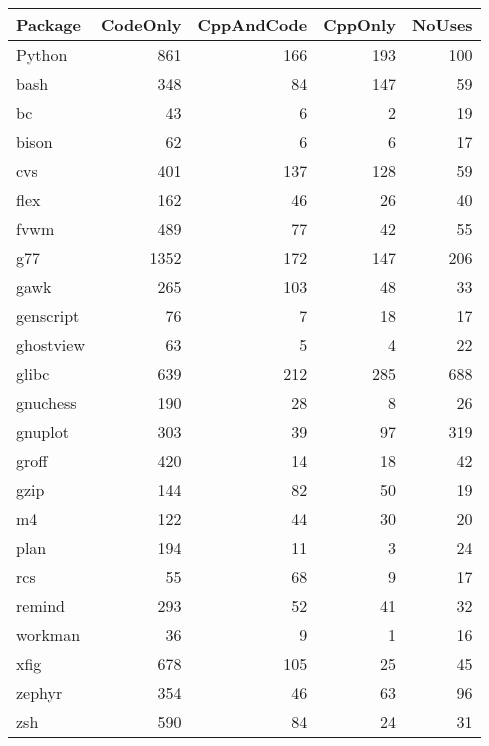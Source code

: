 \begin{tabular}{|l|r|r|r|r|}\hline
Package & CodeOnly & CppAndCode & CppOnly & NoUses\\\hline
Python & 861 & 166 & 193 & 100\\\hline
bash & 348 & 84 & 147 & 59\\\hline
bc & 43 & 6 & 2 & 19\\\hline
bison & 62 & 6 & 6 & 17\\\hline
cvs & 401 & 137 & 128 & 59\\\hline
flex & 162 & 46 & 26 & 40\\\hline
fvwm & 489 & 77 & 42 & 55\\\hline
g77 & 1352 & 172 & 147 & 206\\\hline
gawk & 265 & 103 & 48 & 33\\\hline
genscript & 76 & 7 & 18 & 17\\\hline
ghostview & 63 & 5 & 4 & 22\\\hline
glibc & 639 & 212 & 285 & 688\\\hline
gnuchess & 190 & 28 & 8 & 26\\\hline
gnuplot & 303 & 39 & 97 & 319\\\hline
groff & 420 & 14 & 18 & 42\\\hline
gzip & 144 & 82 & 50 & 19\\\hline
m4 & 122 & 44 & 30 & 20\\\hline
plan & 194 & 11 & 3 & 24\\\hline
rcs & 55 & 68 & 9 & 17\\\hline
remind & 293 & 52 & 41 & 32\\\hline
workman & 36 & 9 & 1 & 16\\\hline
xfig & 678 & 105 & 25 & 45\\\hline
zephyr & 354 & 46 & 63 & 96\\\hline
zsh & 590 & 84 & 24 & 31\\\hline
\end{tabular}
